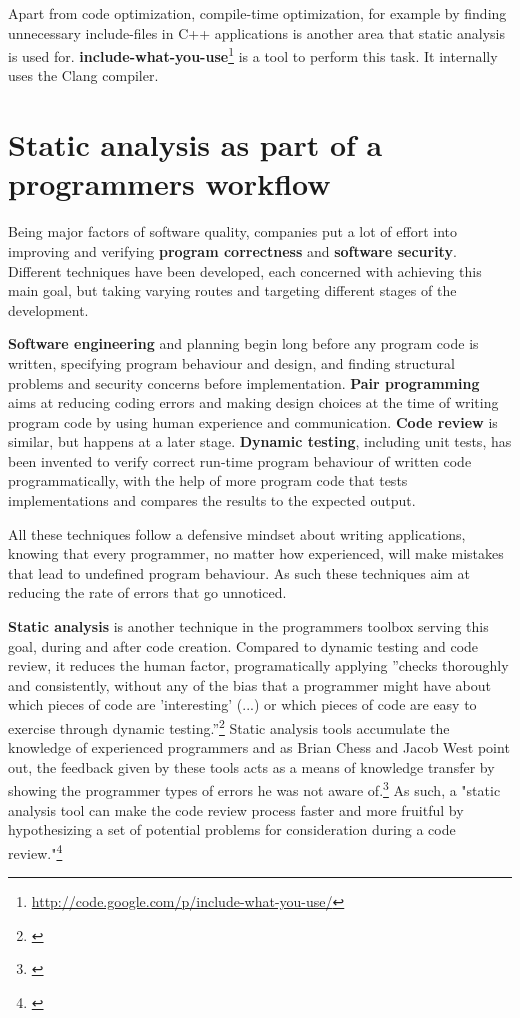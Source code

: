 Apart from code optimization, compile-time optimization, for example by finding unnecessary include-files in C++ applications is another area that static analysis is used for. \textbf{include-what-you-use}\footnote{\url{http://code.google.com/p/include-what-you-use/}} is a tool to perform this task. It internally uses the Clang compiler.

\section{Static analysis as part of a programmers workflow}

Being major factors of software quality, companies put a lot of effort into improving and verifying \textbf{program correctness} and \textbf{software security}. Different techniques have been developed, each concerned with achieving this main goal, but taking varying routes and targeting different stages of the development.

\textbf{Software engineering} and planning begin long before any program code is written, specifying program behaviour and design, and finding structural problems and security concerns before implementation. \textbf{Pair programming} aims at reducing coding errors and making design choices at the time of writing program code by using human experience and communication. \textbf{Code review} is similar, but happens at a later stage. \textbf{Dynamic testing}, including unit tests, has been invented to verify correct run-time program behaviour of written code programmatically, with the help of more program code that tests implementations and compares the results to the expected output.

All these techniques follow a defensive mindset about writing applications, knowing that every programmer, no matter how experienced, will make mistakes that lead to undefined program behaviour. As such these techniques aim at reducing the rate of errors that go unnoticed.

\textbf{Static analysis} is another technique in the programmers toolbox serving this goal, during and after code creation. Compared to dynamic testing and code review, it reduces the human factor, programatically applying ''checks thoroughly and consistently, without any of the bias that a programmer might have about which pieces of code are 'interesting' (...) or which pieces of code are easy to exercise through dynamic testing.''\footnote{\citep[22]{SecureProgramming}} Static analysis tools accumulate the knowledge of experienced programmers and as Brian Chess and Jacob West point out, the feedback given by these tools acts as a means of knowledge transfer by showing the programmer types of errors he was not aware of.\footnote{\citep[22]{SecureProgramming}} As such, a "static analysis tool can make the code review process faster and more fruitful by hypothesizing a set of potential problems for consideration during a code review."\footnote{\citep[13]{SecureProgramming}}

